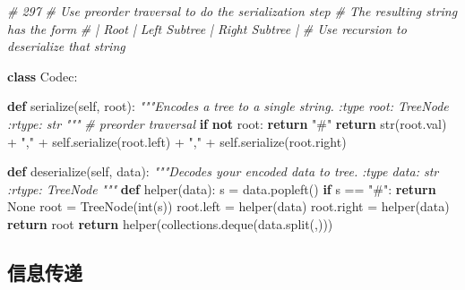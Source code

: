 \documentclass[
]{article}
\newenvironment{Shaded}{}{}
\newcommand{\BuiltInTok}[1]{#1}
\newcommand{\CommentTok}[1]{\textcolor[rgb]{0.38,0.63,0.69}{\textit{#1}}}
\newcommand{\ControlFlowTok}[1]{\textcolor[rgb]{0.00,0.44,0.13}{\textbf{#1}}}
\newcommand{\KeywordTok}[1]{\textcolor[rgb]{0.00,0.44,0.13}{\textbf{#1}}}
\newcommand{\NormalTok}[1]{#1}
\newcommand{\OperatorTok}[1]{\textcolor[rgb]{0.40,0.40,0.40}{#1}}
\newcommand{\StringTok}[1]{\textcolor[rgb]{0.25,0.44,0.63}{#1}}
\newcommand{\VariableTok}[1]{\textcolor[rgb]{0.10,0.09,0.49}{#1}}
\begin{document}
\begin{Shaded}
\begin{Highlighting}[]
\CommentTok{\# 297 }
\CommentTok{\# Use preorder traversal to do the serialization step}
\CommentTok{\# The resulting string has the form}
\CommentTok{\# | Root | Left Subtree | Right Subtree |}
\CommentTok{\# Use recursion to deserialize that string}

\KeywordTok{class}\NormalTok{ Codec:}

    \KeywordTok{def}\NormalTok{ serialize(}\VariableTok{self}\NormalTok{, root):}
        \CommentTok{"""Encodes a tree to a single string.}
\CommentTok{        }
\CommentTok{        :type root: TreeNode}
\CommentTok{        :rtype: str}
\CommentTok{        """}
        \CommentTok{\# preorder traversal}
        \ControlFlowTok{if} \KeywordTok{not}\NormalTok{ root: }\ControlFlowTok{return} \StringTok{"\#"}
        \ControlFlowTok{return} \BuiltInTok{str}\NormalTok{(root.val) }\OperatorTok{+} \StringTok{","} \OperatorTok{+} \VariableTok{self}\NormalTok{.serialize(root.left) }\OperatorTok{+} \StringTok{","} \OperatorTok{+} \VariableTok{self}\NormalTok{.serialize(root.right)}


    \KeywordTok{def}\NormalTok{ deserialize(}\VariableTok{self}\NormalTok{, data):}
        \CommentTok{"""Decodes your encoded data to tree.}
\CommentTok{        }
\CommentTok{        :type data: str}
\CommentTok{        :rtype: TreeNode}
\CommentTok{        """}
        \KeywordTok{def}\NormalTok{ helper(data):}
\NormalTok{            s }\OperatorTok{=}\NormalTok{ data.popleft()}
            \ControlFlowTok{if}\NormalTok{ s }\OperatorTok{==} \StringTok{"\#"}\NormalTok{: }\ControlFlowTok{return} \VariableTok{None}
\NormalTok{            root }\OperatorTok{=}\NormalTok{ TreeNode(}\BuiltInTok{int}\NormalTok{(s))}
\NormalTok{            root.left }\OperatorTok{=}\NormalTok{ helper(data)}
\NormalTok{            root.right }\OperatorTok{=}\NormalTok{ helper(data)}
            \ControlFlowTok{return}\NormalTok{ root}
        \ControlFlowTok{return}\NormalTok{ helper(collections.deque(data.split(}\StringTok{\textquotesingle{},\textquotesingle{}}\NormalTok{)))}
\end{Highlighting}
\end{Shaded}

\hypertarget{ux4fe1ux606fux4f20ux9012}{%
\subsection{信息传递}\label{ux4fe1ux606fux4f20ux9012}}
\end{document}

